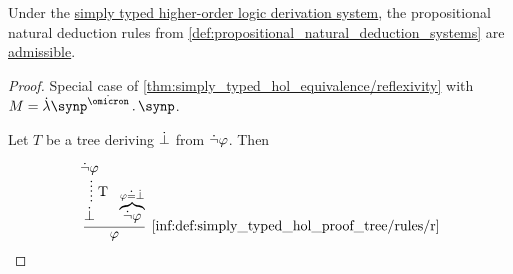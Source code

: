 \begin{proposition}\label{thm:simply_typed_hol_natural_deduction}
  Under the \hyperref[def:simply_typed_hol_proof_tree]{simply typed higher-order logic derivation system}, the propositional natural deduction rules from \cref{def:propositional_natural_deduction_systems} are \hyperref[con:inference_rule_admissibility]{admissible}.
\end{proposition}
\begin{proof}
   Special case of \cref{thm:simply_typed_hol_equivalence/reflexivity} with \( M = \qabs {\synp^{\syn\omicron}} \synp \).

   Let \( T \) be a tree deriving \( \dot{\bot} \) from \( \dot{\neg} \varphi \). Then

  \begin{equation*}
    \begin{prooftree}
      \hypo{ \synneg \varphi }
      \ellipsis { T } { \synbot }

      \hypo { \overbrace{\synneg \varphi}^{\varphi \syneq \synbot} }

      \infer2[\ref{inf:def:simply_typed_hol_proof_tree/rules/r}]{ \varphi }
    \end{prooftree}
  \end{equation*}
\end{proof}

\begin{definition}\label{def:nth_order_logic}
\end{definition}

\begin{definition}\label{def:simply_typed_definitional_extension}\mimprovised
\end{definition}
